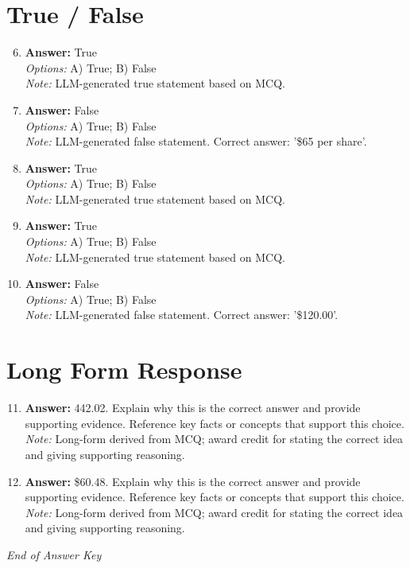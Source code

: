 \documentclass[12pt]{article}
\begin{document}
\section*{True / False}
\begin{enumerate}[label=\arabic*.]
\setcounter{enumi}{5}
\item \textbf{Answer:} True
\\ \textit{Options:} A) True; B) False
\\ \textit{Note:} LLM-generated true statement based on MCQ.
\item \textbf{Answer:} False
\\ \textit{Options:} A) True; B) False
\\ \textit{Note:} LLM-generated false statement. Correct answer: '\$65 per share'.
\item \textbf{Answer:} True
\\ \textit{Options:} A) True; B) False
\\ \textit{Note:} LLM-generated true statement based on MCQ.
\item \textbf{Answer:} True
\\ \textit{Options:} A) True; B) False
\\ \textit{Note:} LLM-generated true statement based on MCQ.
\item \textbf{Answer:} False
\\ \textit{Options:} A) True; B) False
\\ \textit{Note:} LLM-generated false statement. Correct answer: '\$120.00'.
\end{enumerate}

\section*{Long Form Response}
\begin{enumerate}[label=\arabic*.]
\setcounter{enumi}{10}
\item \textbf{Answer:} 442.02. Explain why this is the correct answer and provide supporting evidence. Reference key facts or concepts that support this choice.
\\ \textit{Note:} Long-form derived from MCQ; award credit for stating the correct idea and giving supporting reasoning.
\item \textbf{Answer:} \$60.48. Explain why this is the correct answer and provide supporting evidence. Reference key facts or concepts that support this choice.
\\ \textit{Note:} Long-form derived from MCQ; award credit for stating the correct idea and giving supporting reasoning.
\end{enumerate}

\vfill
\noindent\textit{End of Answer Key}
\end{document}
